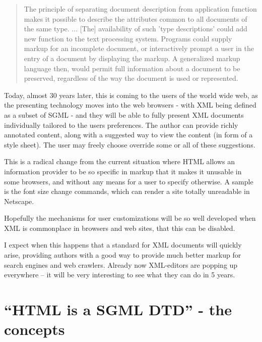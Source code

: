 \begin{quote}
  The principle of separating document description from application
  function makes it possible to describe the attributes common to all
  documents of the same type. ... [The] availability of such 'type
  descriptions' could add new function to the text processing system.
  Programs could supply markup for an incomplete document, or
  interactively prompt a user in the entry of a document by displaying
  the markup. A generalized markup language then, would permit full
  information about a document to be preserved, regardless of the way
  the document is used or represented.
\end{quote}

Today, almost 30 years later, this is coming to the users of the world
wide web, as the presenting technology moves into the web browsers -
with XML being defined as a subset of SGML - and they will be able to
fully present XML documents individually tailored to the users
preferences.  The author can provide richly annotated content, along
with a suggested way to view the content (in form of a style sheet).
The user may freely choose override some or all of these suggestions.

This is a radical change from the current situation where HTML allows
an information provider to be so specific in markup that it makes it
unusable in some browsers, and without any means for a user to specify
otherwise.    A sample is the font size change commands, which can
render a site totally unreadable in Netscape.

Hopefully the mechanisms for user customizations will be so well
developed when XML is commonplace in browsers and web sites, that this
can be disabled.

\textsf{I expect when this happens that} a standard for XML documents
will quickly arise, providing authors with a good way to provide much
better markup for search engines and web crawlers.    Already now
XML-editors are popping up everywhere --  it will be very interesting
to see what they can do in 5 years.



\section{``HTML is a SGML DTD'' - the concepts}

